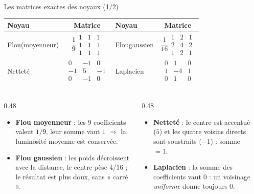 \begin{frame}{Les matrices exactes des noyaux (1/2)}
\begin{center}
{\scriptsize
\setlength{\arraycolsep}{4pt}
\begin{tabular}{@{}l c l c@{}}
\toprule
\textbf{Noyau} & \textbf{Matrice} & \textbf{Noyau} & \textbf{Matrice} \\
\midrule
\addlinespace
Flou\newline (moyenneur) &
$\dfrac{1}{9}\begin{smallmatrix}1&1&1\\1&1&1\\1&1&1\end{smallmatrix}$ &
Flou\newline gaussien &
$\dfrac{1}{16}\begin{smallmatrix}1&2&1\\2&4&2\\1&2&1\end{smallmatrix}$ \\
\addlinespace
Netteté &
$\begin{smallmatrix}0&-1&0\\-1&5&-1\\0&-1&0\end{smallmatrix}$ &
Laplacien &
$\begin{smallmatrix}0&1&0\\1&-4&1\\0&1&0\end{smallmatrix}$ \\
\addlinespace
\bottomrule
\end{tabular}
}
\end{center}
\vspace{1mm}
\begin{columns}[t]
\begin{column}{0.48\textwidth}
\begin{itemize}
  \item \textbf{Flou moyenneur} : les $9$ coefficients valent $1/9$, leur
  somme vaut $1$ $\Rightarrow$ la luminosité moyenne est conservée.
  \item \textbf{Flou gaussien} : les poids décroissent avec la distance,
  le centre pèse $4/16$ ; le résultat est plus doux, sans « carré ».
\end{itemize}
\end{column}
\begin{column}{0.48\textwidth}
\begin{itemize}
  \item \textbf{Netteté} : le centre est accentué ($5$) et les quatre
  voisins directs sont soustraits ($-1$) : somme $= 1$.
  \item \textbf{Laplacien} : la somme des coefficients vaut $0$ : un
  voisinage \emph{uniforme} donne toujours $0$.
\end{itemize}
\end{column}
\end{columns}
\end{frame}

